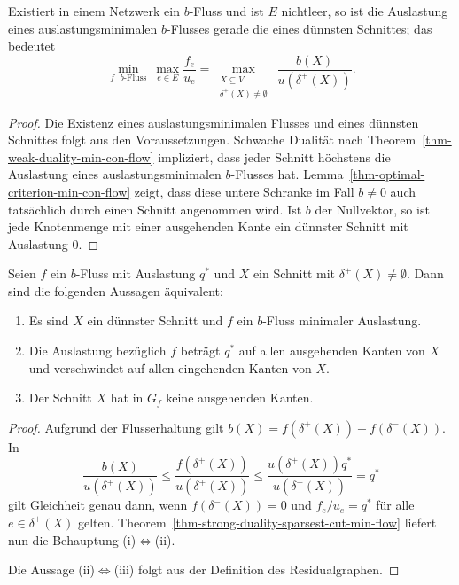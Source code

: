 \begin{theorem}\label{thm-strong-duality-sparsest-cut-min-flow}
	Existiert in einem Netzwerk ein $b$-Fluss und ist $E$ nichtleer, so ist die Auslastung eines auslastungsminimalen $b$-Flusses gerade die eines dünnsten Schnittes; das bedeutet
	\[
	\min_{\text{$f$ $b$-Fluss}}~\max_{e\in E}\frac{f_e}{u_e} = \max_{\substack{X\subseteq V\\ \delta^+(X)\neq\emptyset}} ~ \frac{b(X)}{u(\delta^+(X))}.
	\]
\end{theorem}
\begin{proof}
	Die Existenz eines auslastungsminimalen Flusses und eines dünnsten Schnittes folgt aus den Voraussetzungen.
	Schwache Dualität nach Theorem~\ref{thm-weak-duality-min-con-flow} impliziert, dass jeder Schnitt höchstens die Auslastung eines auslastungsminimalen $b$-Flusses hat.
	Lemma~\ref{thm-optimal-criterion-min-con-flow} zeigt, dass diese untere Schranke im Fall $b\neq 0$ auch tatsächlich durch einen Schnitt angenommen wird.
	Ist $b$ der Nullvektor, so ist jede Knotenmenge mit einer ausgehenden Kante ein dünnster Schnitt mit Auslastung $0$.
\end{proof}

\begin{corollary}\label{cor-easy-characterization-sparsest-cut}
	Seien $f$ ein $b$-Fluss mit Auslastung $q^*$ und $X$ ein Schnitt mit $\delta^+(X)\neq \emptyset$.
	Dann sind die folgenden Aussagen äquivalent:
	\begin{enumerate}[label=(\roman*)]
		\item Es sind $X$ ein dünnster Schnitt und $f$ ein $b$-Fluss minimaler Auslastung.
		\item Die Auslastung bezüglich $f$ beträgt $q^*$ auf allen ausgehenden Kanten von $X$ und verschwindet auf allen eingehenden Kanten von $X$.
		\item Der Schnitt $X$ hat in $G_f$ keine ausgehenden Kanten.
	\end{enumerate}
\end{corollary}
\begin{proof}
	Aufgrund der Flusserhaltung gilt $b(X) = f(\delta^+(X)) - f(\delta^-(X))$.
	In \[
	\frac{b(X)}{u(\delta^+(X))} \leq \frac{f(\delta^+(X))}{u(\delta^+(X))} \leq \frac{u(\delta^+(X)) q^*}{u(\delta^+(X))} = q^*
	\]
	gilt Gleichheit genau dann, wenn $f(\delta^-(X))=0$ und $f_{e}/u_{e} = q^*$ für alle $e\in\delta^+(X)$ gelten.
	Theorem~\ref{thm-strong-duality-sparsest-cut-min-flow} liefert nun die Behauptung (i)$\Leftrightarrow$(ii).
	
	Die Aussage (ii)$\Leftrightarrow$(iii) folgt aus der Definition des Residualgraphen.
\end{proof}

